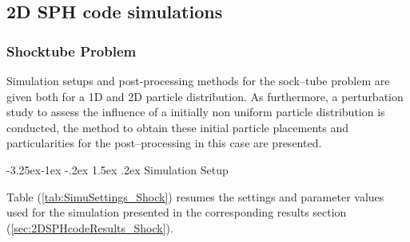 \documentclass[11pt,a4paper,twoside]{report}
\makeatletter
\renewcommand\paragraph{\@startsection{paragraph}{4}{\z@}%
  {-3.25ex\@plus -1ex \@minus -.2ex}%
  {1.5ex \@plus .2ex}%
  {\normalfont\normalsize\bfseries}}
\makeatother
\begin{document}


\subsection{2D SPH code simulations}
\label{sec:2DSPHcodeGeneralTestCaseIntroduction}

\subsubsection{Shocktube Problem}
\label{sec:2Dshock_simuSetup&Co}
Simulation setups and post-processing methods for the sock--tube problem are given both for a 1D and 2D particle distribution. As furthermore, a perturbation study to assess the influence of a initially non uniform particle distribution is conducted, the method to obtain these initial particle placements and particularities for the post--processing in this case are presented. 

\paragraph{Simulation Setup}

Table (\ref{tab:SimuSettings_Shock}) resumes the settings and parameter values used for the simulation presented in the corresponding results section (\ref{sec:2DSPHcodeResults_Shock}). 
\end{document}

